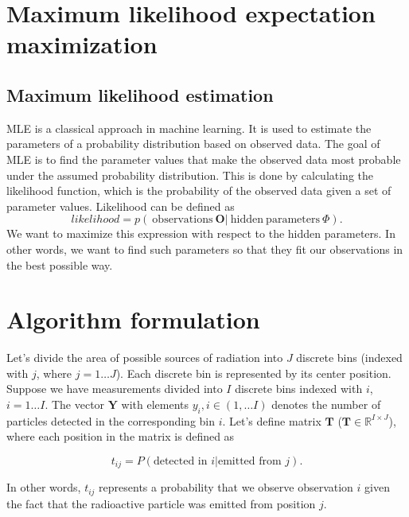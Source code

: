 \section{Maximum likelihood expectation maximization}



\cite{1982_shepp_vardi_MLEM} \cite{EM} \cite{wilderman}

\subsection{Maximum likelihood estimation}
\ac{MLE} is a classical approach in machine learning.
It is used to estimate the parameters of a probability distribution based on observed data. 
The goal of \ac{MLE} is to find the parameter values that make the observed data most probable under the assumed probability distribution.
This is done by calculating the likelihood function, which is the probability of the observed data given a set of parameter values.
Likelihood can be defined as 
\begin{equation}
  likelihood = p(\ \mathrm{observations } \  \boldsymbol{O} | \ \mathrm{hidden \ parameters\ } \Phi ).
  \label{eq:likelihood}
\end{equation}
We want to maximize this expression with respect to the hidden parameters.
In other words, we want to find such parameters so that they fit our observations in the best possible way.

\section{Algorithm formulation}
Let's divide the area of possible sources of radiation into $J$ discrete bins (indexed with $j$, where $j = 1 \dotsc J$).
Each discrete bin is represented by its center position.
Suppose we have measurements divided into $I$ discrete bins indexed with $i$, $i = 1 \dotsc I$.
The vector $\mathbf{Y}$ with elements $y_{i}, i \in (1, \dots I)$ denotes the number of particles detected in the corresponding bin $i$.
Let's define matrix $\mathbf{T}$ ($\mathbf{T} \in \mathbb{R}^{I \times J}$), where each position in the matrix is defined as

\begin{equation}
  t_{ij} =  P(\textrm{detected in } i | \textrm{emitted from } j).
\end{equation}

In other words, $t_{ij}$ represents a probability that we observe observation $i$ given the fact that the radioactive particle was emitted from position $j$.

